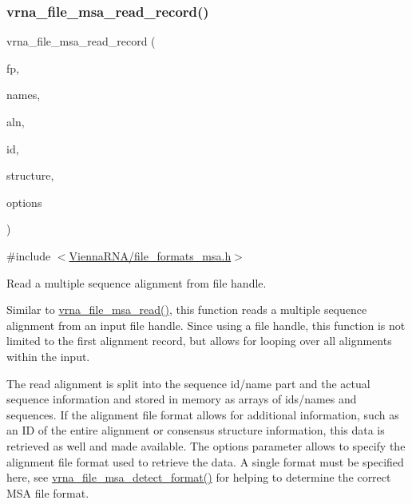 \mbox{\label{group__file__utils_ga59204cd1daa4927f5127cc65a2886efd}} 
\subsubsection{\texorpdfstring{vrna\+\_\+file\+\_\+msa\+\_\+read\+\_\+record()}{vrna\_file\_msa\_read\_record()}}
{\footnotesize\ttfamily vrna\+\_\+file\+\_\+msa\+\_\+read\+\_\+record (\begin{DoxyParamCaption}\item[{F\+I\+LE $\ast$}]{fp,  }\item[{char $\ast$$\ast$$\ast$}]{names,  }\item[{char $\ast$$\ast$$\ast$}]{aln,  }\item[{char $\ast$$\ast$}]{id,  }\item[{char $\ast$$\ast$}]{structure,  }\item[{unsigned int}]{options }\end{DoxyParamCaption})}



{\ttfamily \#include $<$\mbox{\hyperlink{file__formats__msa_8h}{Vienna\+R\+N\+A/file\+\_\+formats\+\_\+msa.\+h}}$>$}



Read a multiple sequence alignment from file handle. 

Similar to \mbox{\hyperlink{group__file__utils_ga08a01c40ac5f5e0e04e9ae2258c99aa6}{vrna\+\_\+file\+\_\+msa\+\_\+read()}}, this function reads a multiple sequence alignment from an input file handle. Since using a file handle, this function is not limited to the first alignment record, but allows for looping over all alignments within the input.

The read alignment is split into the sequence id/name part and the actual sequence information and stored in memory as arrays of ids/names and sequences. If the alignment file format allows for additional information, such as an ID of the entire alignment or consensus structure information, this data is retrieved as well and made available. The {\ttfamily options} parameter allows to specify the alignment file format used to retrieve the data. A single format must be specified here, see \mbox{\hyperlink{group__file__utils_ga627ac281b5f11c63861726e6472626c9}{vrna\+\_\+file\+\_\+msa\+\_\+detect\+\_\+format()}} for helping to determine the correct M\+SA file format.

